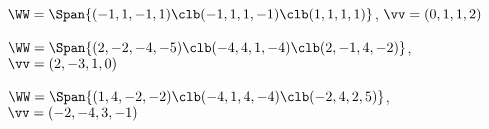 \begin{exercise}
\begin{Parts}
\begin{OmitV1}
\item \(\WW=\Span\{(-1,1,-1,1)\clb(-1,1,1,-1)\clb( 1,1,1,1)\}\), \(\vv=(0,1,1,2)\)

\item \(\WW=\Span\{(2,-2,-4,-5)\clb(-4,4,1,-4)\clb(2,-1,4,-2)\}\), \(\vv=(2,-3,1,0)\)
\end{OmitV1}

\item \(\WW=\Span\{(1,4,-2,-2)\clb (-4,1,4,-4)\clb (-2,4,2,5)\}\), \(\vv=(-2,-4,3,-1)\)

%
\end{Parts}  
\end{exercise}





